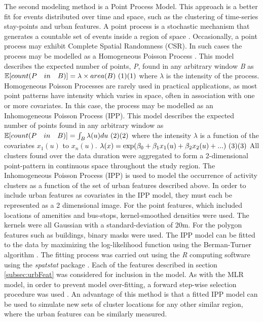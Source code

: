 {
    The second modeling method is a Point Process Model. This approach is a better fit for events distributed over time and space, such as the clustering of time-series stay-points and urban features. A point process is a stochastic mechanism that generates a countable set of events inside a region of space \cite{diggle2013statistical}. Occasionally, a point process may exhibit Complete Spatial Randomness (CSR). In such cases the process may be modelled as a Homogeneous Poisson Process \cite{baddeley2008analysing}. This model describes the expected number of points, \textit{P}, found in any arbitrary window \textit{B} as
    $
        \mathbb{E}[count(P \quad in \quad B)] = \lambda \times area(B)\inlineeqno{(1)}
    $
    where $\lambda$ is the intensity of the process. Homogeneous Poisson Processes are rarely used in practical applications, as most point patterns have intensity which varies in space, often in association with one or more covariates. In this case, the process may be modelled as an Inhomogeneous Poisson Process (IPP). This model describes the expected number of points found in any arbitrary window as
    $
        \mathbb{E}[count(P \quad in \quad B)] = \int_{B}\lambda(u)du \inlineeqno{(2)}
    $
    where the intensity $\lambda$ is a function of the covariates $x_1(u)$ to $x_n(u)$.
    $
        \lambda(x)=\exp(\beta_0+\beta_1x_1(u)+\beta_2x_2(u)+...)\inlineeqno{(3)}
    $
    All clusters found over the data duration were aggregated to form a 2-dimensional point-pattern in continuous space throughout the study region. The Inhomogeneous Poisson Process (IPP) is used to model the occurrence of activity clusters as a function of the set of urban features described above.
    \newline
    In order to include urban features as covariates in the IPP model, they must each be represented as a 2 dimensional image. For the point features, which included locations of amenities and bus-stops, kernel-smoothed densities were used. The kernels were all Gaussian with a standard-deviation of 20m. For the polygon features such as buildings, binary masks were used. The IPP model can be fitted to the data by maximizing the log-likelihood function using the Berman-Turner algorithm \cite{berman1992approximating}.
    The fitting process was carried out using the \textit{R} computing software using the \textit{spatstat} package \cite{baddeley2005spatstat}. Each of the features described in section \eqref{subsec:urbFeat} was considered for inclusion in the model. As with the MLR model, in order to prevent model over-fitting, a forward step-wise selection procedure was used \cite{friedman2001elements}. An advantage of this method is that a fitted IPP model can be used to simulate new sets of cluster locations for any other similar region, where the urban features can be similarly measured.
}

